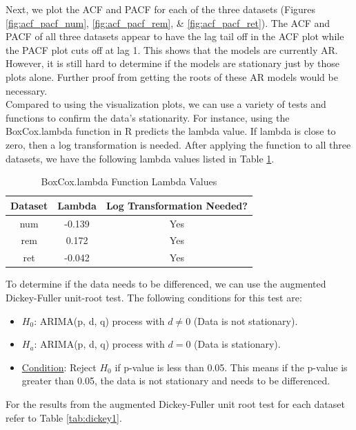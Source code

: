 \documentclass[a4paper]{article}
\begin{document}
Next, we plot the ACF and PACF for each of the three datasets (Figures \ref{fig:acf_pacf_num}, \ref{fig:acf_pacf_rem}, \& \ref{fig:acf_pacf_ret}). The ACF and PACF of all three datasets appear to have the lag tail off in the ACF plot while the PACF plot cuts off at lag 1. This shows that the models are currently AR. However, it is still hard to determine if the models are stationary just by those plots alone. Further proof from getting the roots of these AR models would be necessary.\\

Compared to using the visualization plots, we can use a variety of tests and functions to confirm the data's stationarity. For instance, using the BoxCox.lambda function in R predicts the lambda value. If lambda is close to zero, then a log transformation is needed. After applying the function to all three datasets, we have the following lambda values listed in Table \ref{tab:lambda}. \\

\begin{table}[h!]
    \centering
    \caption{BoxCox.lambda Function Lambda Values}
    \begin{tabular}{|c|c|c|}
    \hline
    Dataset & Lambda & Log Transformation Needed? \\
    \hline
    num & -0.139 & Yes \\ 
    \hline
    rem & 0.172 & Yes \\
    \hline
    ret & -0.042 & Yes \\ 
    \hline
    \end{tabular}
    \label{tab:lambda}
\end{table}

To determine if the data needs to be differenced, we can use the augmented Dickey-Fuller unit-root test. The following conditions for this test are:

\begin{itemize}
    \item \underline{$H_0$}: ARIMA(p, d, q) process with $d \neq 0$ (Data is not stationary).
    \item \underline{$H_a$}: ARIMA(p, d, q) process with $d =  0$ (Data is stationary).
    \item \underline{Condition}: Reject $H_0$ if p-value is less than 0.05. This means if the p-value is greater than 0.05, the data is not stationary and needs to be differenced.
\end{itemize}

For the results from the augmented Dickey-Fuller unit root test for each dataset refer to Table \ref{tab:dickey1}.
\end{document}
